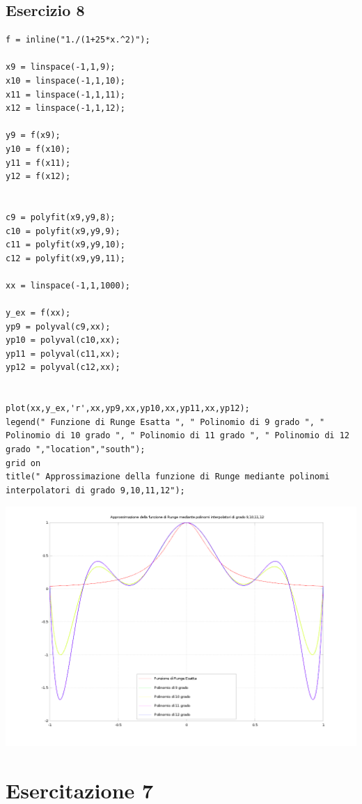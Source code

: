 \documentclass{article}
\begin{document}
\newpage
\subsection{ Esercizio 8}
\begin{lstlisting}
f = inline("1./(1+25*x.^2)");

x9 = linspace(-1,1,9);
x10 = linspace(-1,1,10);
x11 = linspace(-1,1,11);
x12 = linspace(-1,1,12);

y9 = f(x9);
y10 = f(x10);
y11 = f(x11);
y12 = f(x12);


c9 = polyfit(x9,y9,8);
c10 = polyfit(x9,y9,9);
c11 = polyfit(x9,y9,10);
c12 = polyfit(x9,y9,11);

xx = linspace(-1,1,1000);

y_ex = f(xx);
yp9 = polyval(c9,xx);
yp10 = polyval(c10,xx);
yp11 = polyval(c11,xx);
yp12 = polyval(c12,xx);


plot(xx,y_ex,'r',xx,yp9,xx,yp10,xx,yp11,xx,yp12);
legend(" Funzione di Runge Esatta ", " Polinomio di 9 grado ", " Polinomio di 10 grado ", " Polinomio di 11 grado ", " Polinomio di 12 grado ","location","south");
grid on
title(" Approssimazione della funzione di Runge mediante polinomi interpolatori di grado 9,10,11,12");
\end{lstlisting}


\centerline{\includegraphics[scale=0.6]{ex68.png}}


\section{Esercitazione 7}
\end{document}
